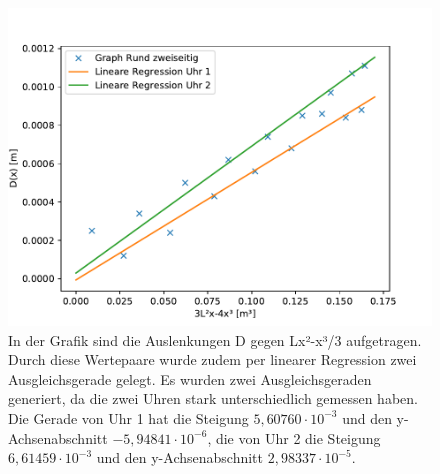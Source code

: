\documentclass[titlepage = firstcover]{scrartcl}
\begin{document}
      \begin{figure}[h]
        \centering
        \includegraphics[width=0.7\linewidth]{rzwei.pdf}
        \caption{In der Grafik sind die Auslenkungen D gegen Lx²-x³/3 aufgetragen. Durch diese Wertepaare wurde zudem per linearer Regression zwei Ausgleichsgerade gelegt. Es wurden zwei Ausgleichsgeraden generiert, da die zwei Uhren stark unterschiedlich gemessen haben. Die Gerade von Uhr 1 hat die Steigung $5,60760\cdot10^{-3}$ und den y-Achsenabschnitt $-5,94841\cdot10^{-6}$, die von Uhr 2 die Steigung $6,61459\cdot10^{-3}$ und den y-Achsenabschnitt $2,98337\cdot10^{-5}$.}
        \label{fig:graphRzwei}
      \end{figure}
\end{document}
